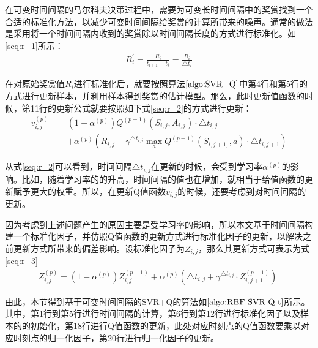 在可变时间间隔的马尔科夫决策过程中，需要为可变长时间间隔中的奖赏找到一个合适的标准化方法，以减少可变时间间隔给奖赏的计算所带来的噪声。通常的做法是采用将一个时间间隔内收到的奖赏除以时间间隔长度的方式进行标准化。如\eqref{seq:r_1}所示：
\begin{equation}\label{seq:r_1}
\begin{aligned}
R_{i}^{'}=\frac{R_{i}}{t_{i+1}-t_{i}}=\frac{R_{i}}{\triangle t_{i}}
\end{aligned}
\end{equation}

在对原始奖赏值$R_{i}$进行标准化后，就要按照算法$\ref{algo:SVR+Q}$中第4行和第5行的方式进行更新样本，并利用样本得到奖赏的估计模型。那么，此时更新值函数的时候，第11行的更新公式就要按照如下式\eqref{seq:r_2}的方式进行更新：
\begin{equation}\label{seq:r_2}
\begin{aligned}
v_{i,j}^{(p)}=&(1-\alpha^{(p)})Q^{(p-1)}(S_{i,j},A_{i,j}) \cdot \triangle t_{i,j} \\
&+ \alpha^{(p)} (R_{i,j} + \gamma^{\triangle t_{i,j}} \max_{a} Q^{(p-1)}(S_{i,j+1,},a) \cdot \triangle t_{i,j+1})
\end{aligned}
\end{equation}

从式\eqref{seq:r_2}可以看到，时间间隔$\triangle t_{i,j}$在更新的时候，会受到学习率$\alpha^{(p)}$的影响。比如，随着学习率的的升高，时间间隔的值也在增加，就相当于给值函数的更新赋予更大的权重。所以，在更新Q值函数$v_{i,j}$的时候，还要考虑到对时间间隔的更新。

因为考虑到上述问题产生的原因主要是受学习率的影响，所以本文基于时间间隔构建一个标准化因子，并仿照Q值函数的更新方式进行标准化因子的更新，以解决之前更新方式所带来的偏差影响。设标准化因子为$Z_{i,j}$，那么其更新方式可表示为式\eqref{seq:r_3}
\begin{equation}\label{seq:r_3}
\begin{aligned}
Z^{(p)}_{i,j}=(1-\alpha^{(p)})Z^{(p-1)}_{i,j}+\alpha^{(p)}(\triangle t_{i,j} + \gamma^{\triangle t_{i,j}} \cdot Z^{(p-1)}_{i,j+1})\;
\end{aligned}
\end{equation}

由此，本节得到基于可变时间间隔的SVR+Q的算法如$\ref{algo:RBF-SVR-Q-t}$所示。其中，第1行到第5行进行时间间隔的计算，第6行到第12行进行标准化因子以及样本的的初始化，第18行进行Q值函数的更新，此处对应时刻点的Q值函数要乘以对应时刻点的归一化因子，第20行进行归一化因子的更新。

